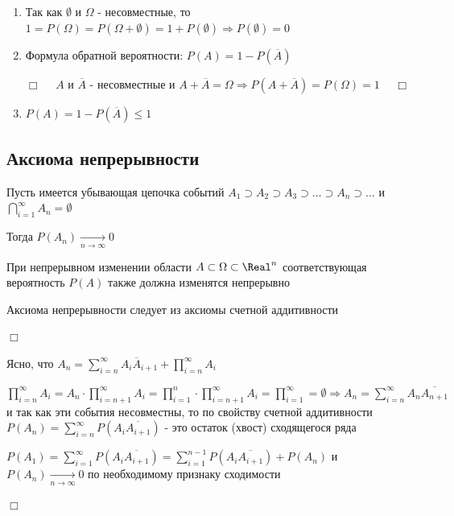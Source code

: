 \documentclass[12pt]{article}
\begin{document}
    \begin{enumerate}

        \item Так как $\emptyset$ и $\Omega$ - несовместные, то $1 = P(\Omega) = P(\Omega + \emptyset) = 1 + P(\emptyset) \Longrightarrow P(\emptyset) = 0$

        \item Формула обратной вероятности: $P(A) = 1 - P(\overline{A})$

        \begin{tcolorbox}
            $\Box \quad$ $A$ и $\overline{A}$ - несовместные и $A + \overline{A} = \Omega \Longrightarrow P(A + \overline{A}) = P(\Omega) = 1$ $\quad \Box$
        \end{tcolorbox}

        \item $P(A) = 1 - P(\overline{A}) \leq 1$

    \end{enumerate}

    \hypertarget{continuityaxiom}{}

    \subsection{Аксиома непрерывности}

    \begin{MyTheorem}
        \Ths Пусть имеется убывающая цепочка событий $A_1 \supset A_2 \supset A_3 \supset \dots \supset A_n \supset \dots$ и $\bigcap_{i = 1}^\infty A_n = \emptyset$

        Тогда $P(A_n) \underset{n \to \infty}{\to} 0$

        При непрерывном изменении области $A \subset \Omega \subset \Real^n$ соответствующая вероятность $P(A)$ также должна изменятся непрерывно
    \end{MyTheorem}

    Аксиома непрерывности следует из аксиомы счетной аддитивности

    \begin{tcolorbox}
        $\Box$

        Ясно, что $A_n = \sum_{i = n}^\infty A_i \overline{A}_{i + 1} + \prod_{i = n}^\infty A_i$

        $\prod_{i = n}^\infty A_i = A_n \cdot \prod_{i = n + 1}^\infty A_i = \prod_{i = 1}^n
        \cdot \prod_{i = n + 1}^\infty A_i = \prod_{i = 1}^\infty = \emptyset \Longrightarrow
        A_n = \sum_{i = n}^\infty A_n \overline{A_{n + 1}}$ и так как эти события несовместны,
        то по свойству счетной аддитивности $P(A_n) = \sum_{i = n}^\infty P(A_i \overline{A_{i + 1}})$ - это остаток (хвост) сходящегося ряда

        $P(A_1) = \sum_{i = 1}^\infty P(A_i \overline{A_{i + 1}}) = \sum_{i = 1}^{n - 1} P(A_i \overline{A_{i + 1}}) + P(A_n)$ и $P(A_n) \underset{n \to \infty}{\to} 0$ по необходимому признаку сходимости

        $\Box$
    \end{tcolorbox}
\end{document}

